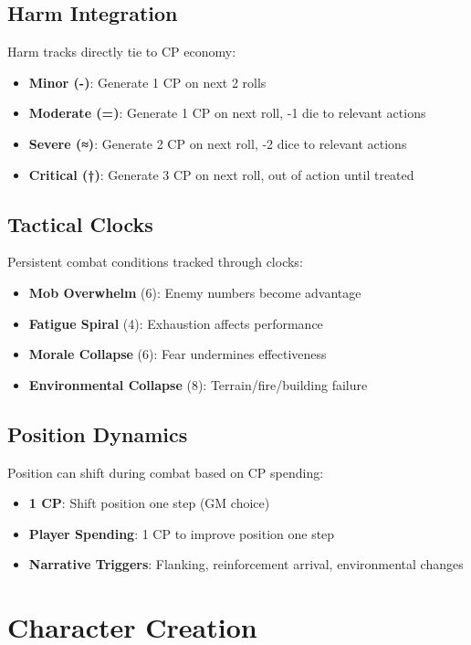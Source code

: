 \documentclass[11pt]{article}
\begin{document}
\subsection{Harm Integration}
Harm tracks directly tie to CP economy:
\begin{itemize}
    \item \textbf{Minor (-)}: Generate 1 CP on next 2 rolls
    \item \textbf{Moderate (=)}: Generate 1 CP on next roll, -1 die to relevant actions
    \item \textbf{Severe (≈)}: Generate 2 CP on next roll, -2 dice to relevant actions  
    \item \textbf{Critical (†)}: Generate 3 CP on next roll, out of action until treated
\end{itemize}

\subsection{Tactical Clocks}
Persistent combat conditions tracked through clocks:
\begin{itemize}
    \item \textbf{Mob Overwhelm} (6): Enemy numbers become advantage
    \item \textbf{Fatigue Spiral} (4): Exhaustion affects performance
    \item \textbf{Morale Collapse} (6): Fear undermines effectiveness
    \item \textbf{Environmental Collapse} (8): Terrain/fire/building failure
\end{itemize}

\subsection{Position Dynamics}
Position can shift during combat based on CP spending:
\begin{itemize}
    \item \textbf{1 CP}: Shift position one step (GM choice)
    \item \textbf{Player Spending}: 1 CP to improve position one step
    \item \textbf{Narrative Triggers}: Flanking, reinforcement arrival, environmental changes
\end{itemize}

\section{Character Creation}
\end{document}
